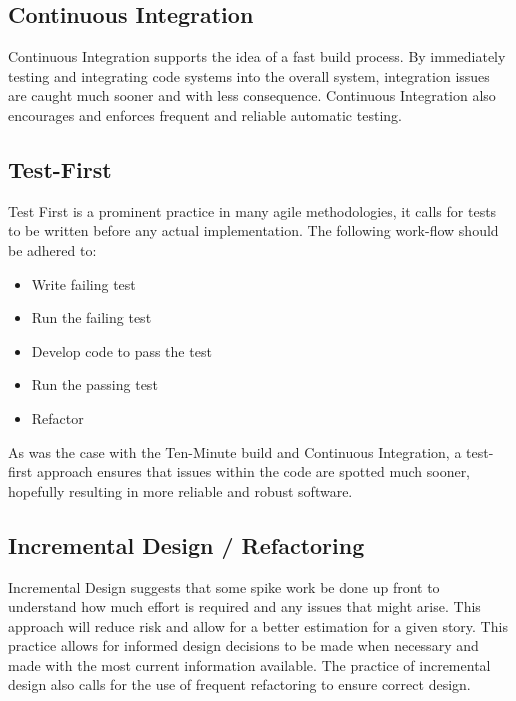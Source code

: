 \documentclass[11pt,fleqn,twoside]{article}
\begin{document}
\subsection{Continuous Integration}
Continuous Integration supports the idea of a fast build process. By immediately testing and integrating code systems into the overall system, integration issues are caught much sooner and with less consequence. Continuous Integration also encourages and enforces frequent and reliable automatic testing. 

\subsection{Test-First}
Test First is a prominent practice in many agile methodologies, it calls for tests to be written before any actual implementation. The following work-flow should be adhered to:

\begin{itemize}
	\item Write failing test
	\item Run the failing test
	\item Develop code to pass the test
	\item Run the passing test
	\item Refactor
\end{itemize}

As was the case with the Ten-Minute build and Continuous Integration, a test-first approach ensures that issues within the code are spotted much sooner, hopefully resulting in more reliable and robust software.

\subsection{Incremental Design / Refactoring}
Incremental Design suggests that some spike work be done up front to understand how much effort is required and any issues that might arise. This approach will reduce risk and allow for a better estimation for a given story. This practice allows for informed design decisions to be made when necessary and made with the most current information available. The practice of incremental design also calls for the use of frequent refactoring to ensure correct design.

\nocite{*}
\newpage
{}

\renewcommand{\refname}{Initial Annotated Bibliography}

\end{document}
